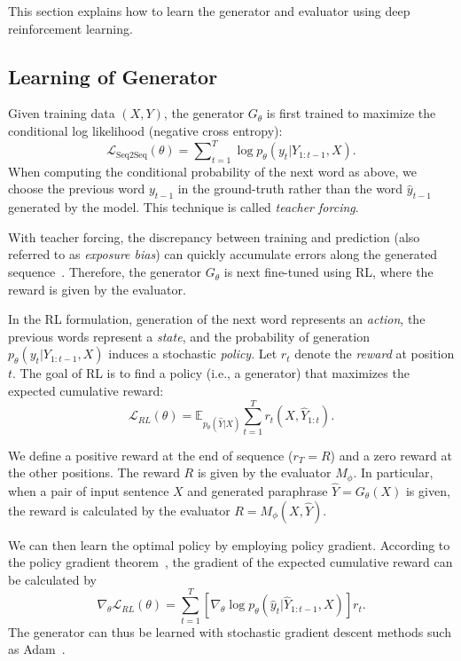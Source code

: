 \documentclass[11pt,a4paper]{article}
\newcommand{\GT}{G_{\theta}}
\begin{document}
    This section explains how to learn the generator and evaluator using deep reinforcement learning.

    \subsection{Learning of Generator}\label{sec:seq2seq-rl}
    Given training data $(X,Y)$, the generator $\GT$ is first trained to maximize the conditional log likelihood (negative cross entropy):
        \begin{equation}\label{eqn:seq2seq}
            \mathcal{L}_{\text{Seq2Seq}}(\theta) = \sum\nolimits_{t=1}^T\log p_{\theta}(y_{t}|Y_{1:t-1}, X).
        \end{equation}
    When computing the conditional probability of the next word as above, we choose the previous word $y_{t-1}$ in the ground-truth rather than the word $\hat{y}_{t-1}$ generated by the model. This technique is called \textit{teacher forcing}.

    With teacher forcing, the discrepancy between training and prediction (also referred to as \textit{exposure bias}) can quickly accumulate errors along the generated sequence~\citep{bengio2015scheduled,ranzato2015sequence}. Therefore, the generator $G_{\theta}$ is next fine-tuned using RL, where the reward is given by the evaluator.

    In the RL formulation, generation of the next word represents an \textit{action}, the previous words represent a \textit{state}, and the probability of generation $p_{\theta}(y_{t}|Y_{1:t-1}, X)$ induces a stochastic \textit{policy}. Let $r_t$ denote the \textit{reward} at position $t$. The goal of RL is to find a policy (i.e., a generator) that maximizes the expected cumulative reward:
        \begin{equation}\label{eqn:rl}
            \mathcal{L}_{RL}(\theta) = \mathbb{E}_{p_{\theta}(\hat{Y}|X)}\sum_{t=1}^{T}r_t(X, \hat{Y}_{1:t}).
        \end{equation}

    We define a positive reward at the end of sequence ($r_T=R$) and a zero reward at the other positions. The reward $R$ is given by the evaluator $M_{\phi}$. In particular, when a pair of input sentence $X$ and generated paraphrase $\hat{Y}=\GT(X)$ is given, the reward is calculated by the evaluator $R=M_{\phi}(X,\hat{Y})$.

    We can then learn the optimal policy by employing policy gradient. According to the policy gradient theorem~\citep{williams1992simple,sutton2000policy}, the gradient of the expected cumulative reward can be calculated by
    \begin{equation}\label{eqn:policy-gradient}
        \nabla_{\theta} \mathcal{L}_{RL}(\theta) = \sum_{t=1}^T[\nabla_{\theta}\log p_{\theta}(\hat{y}_{t}|\hat{Y}_{1:t-1}, X)]r_t.
    \end{equation}
    The generator can thus be learned  with stochastic gradient descent methods such as Adam~\citep{kingma2014adam}.
\end{document}
